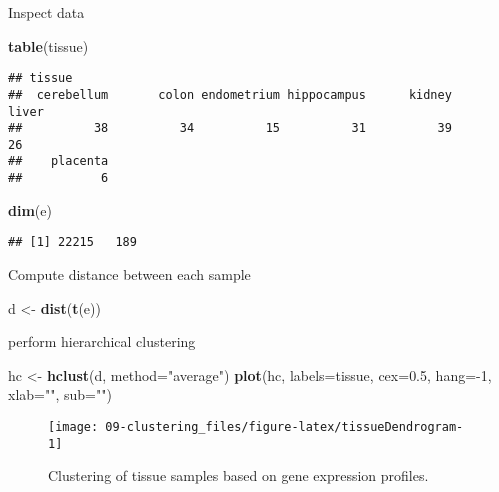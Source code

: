 \documentclass[]{book}
\newenvironment{Shaded}{\begin{snugshade}}{\end{snugshade}}
\newcommand{\KeywordTok}[1]{\textcolor[rgb]{0.13,0.29,0.53}{\textbf{{#1}}}}
\newcommand{\DataTypeTok}[1]{\textcolor[rgb]{0.13,0.29,0.53}{{#1}}}
\newcommand{\DecValTok}[1]{\textcolor[rgb]{0.00,0.00,0.81}{{#1}}}
\newcommand{\FloatTok}[1]{\textcolor[rgb]{0.00,0.00,0.81}{{#1}}}
\newcommand{\StringTok}[1]{\textcolor[rgb]{0.31,0.60,0.02}{{#1}}}
\newcommand{\NormalTok}[1]{{#1}}
\theoremstyle{definition}
\theoremstyle{definition}
\theoremstyle{definition}
\theoremstyle{remark}
\begin{document}
Inspect data

\begin{Shaded}
\begin{Highlighting}[]
\KeywordTok{table}\NormalTok{(tissue)}
\end{Highlighting}
\end{Shaded}

\begin{verbatim}
## tissue
##  cerebellum       colon endometrium hippocampus      kidney       liver 
##          38          34          15          31          39          26 
##    placenta 
##           6
\end{verbatim}

\begin{Shaded}
\begin{Highlighting}[]
\KeywordTok{dim}\NormalTok{(e)}
\end{Highlighting}
\end{Shaded}

\begin{verbatim}
## [1] 22215   189
\end{verbatim}

Compute distance between each sample

\begin{Shaded}
\begin{Highlighting}[]
\NormalTok{d <-}\StringTok{ }\KeywordTok{dist}\NormalTok{(}\KeywordTok{t}\NormalTok{(e))}
\end{Highlighting}
\end{Shaded}

perform hierarchical clustering

\begin{Shaded}
\begin{Highlighting}[]
\NormalTok{hc <-}\StringTok{ }\KeywordTok{hclust}\NormalTok{(d, }\DataTypeTok{method=}\StringTok{"average"}\NormalTok{)}
\KeywordTok{plot}\NormalTok{(hc, }\DataTypeTok{labels=}\NormalTok{tissue, }\DataTypeTok{cex=}\FloatTok{0.5}\NormalTok{, }\DataTypeTok{hang=}\NormalTok{-}\DecValTok{1}\NormalTok{, }\DataTypeTok{xlab=}\StringTok{""}\NormalTok{, }\DataTypeTok{sub=}\StringTok{""}\NormalTok{)}
\end{Highlighting}
\end{Shaded}

\begin{figure}

{\centering \texttt{[image: 09-clustering\_files/figure-latex/tissueDendrogram-1]} 

}

\caption{Clustering of tissue samples based on gene expression profiles. }\label{fig:tissueDendrogram}
\end{figure}
\end{document}
